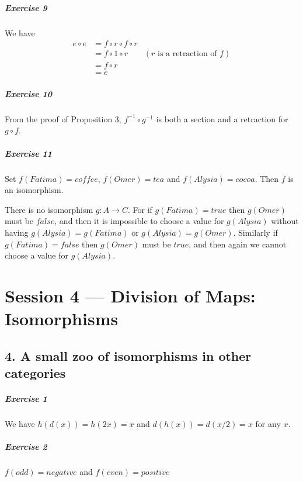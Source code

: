\documentclass{report}
\newcommand{\inv}[1]{\ensuremath{{#1}^{-1}}}
\begin{document}
    \paragraph{Exercise 9}
    We have
    \begin{align*}
        e \circ e & = f \circ r \circ f \circ r \\
        & = f \circ 1 \circ r & (\text{$r$ is a retraction of $f$}) \\
        & = f \circ r \\
        & = e
    \end{align*}

    \paragraph{Exercise 10}
    From the proof of Proposition 3, $\inv{f} \circ \inv{g}$ is both a section and a retraction for
    $g \circ f$.

    \paragraph{Exercise 11}
    Set $f(Fatima) = coffee$, $f(Omer) = tea$ and $f(Alysia) = cocoa$. Then $f$ is an isomorphism.

    There is no isomorphism $g : A \rightarrow C$. For if $g(Fatima) = true$ then $g(Omer)$ must be $false$,
    and then it is impossible to choose a value for $g(Alysia)$ without having $g(Alysia) = g(Fatima)$
    or $g(Alysia) = g(Omer)$. Similarly if $g(Fatima) = false$ then $g(Omer)$ must be $true$, and then
    again we cannot choose a value for $g(Alysia)$.

    \chapter{Session 4 --- Division of Maps: Isomorphisms}

    \section{4. A small zoo of isomorphisms in other categories}

    \paragraph{Exercise 1}
    We have $h(d(x)) = h(2x) = x$ and $d(h(x)) = d(x/2) = x$ for any $x$.

    \paragraph{Exercise 2}
    $f(odd) = negative$ and $f(even) = positive$
\end{document}
